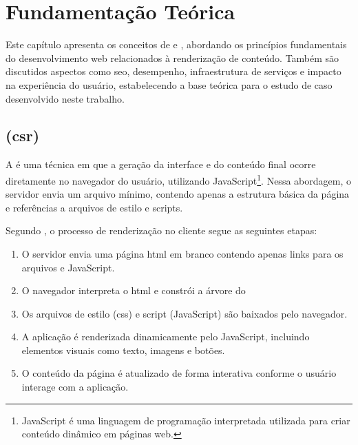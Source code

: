 \chapter{Fundamentação Teórica}
\label{cap:fundamentacao}

Este capítulo apresenta os conceitos de  e , abordando os princípios fundamentais do desenvolvimento web relacionados à renderização de conteúdo. Também são discutidos aspectos como \acrshort{seo}, desempenho, infraestrutura de serviços e impacto na experiência do usuário, estabelecendo a base teórica para o estudo de caso desenvolvido neste trabalho.

\section{ (\acrshort{csr})}
\label{subsec:csr}

A \textbf{} é uma técnica em que a geração da interface e do conteúdo final ocorre diretamente no navegador do usuário, utilizando JavaScript\footnote{JavaScript é uma linguagem de programação interpretada utilizada para criar conteúdo dinâmico em páginas web.}. Nessa abordagem, o servidor envia um arquivo  mínimo, contendo apenas a estrutura básica da página e referências a arquivos de estilo e scripts.{\cite{atori2024}}

Segundo , o processo de renderização no cliente segue as seguintes etapas:

\begin{enumerate}
    \item O servidor envia uma página \acrshort{html} em branco contendo apenas links para os arquivos  e JavaScript.
    \item O navegador interpreta o \acrshort{html} e constrói a árvore do 
    \item Os arquivos de estilo (\acrshort{css}) e script (JavaScript) são baixados pelo navegador.
    \item A aplicação é renderizada dinamicamente pelo JavaScript, incluindo elementos visuais como texto, imagens e botões.
    \item O conteúdo da página é atualizado de forma interativa conforme o usuário interage com a aplicação.
\end{enumerate}

